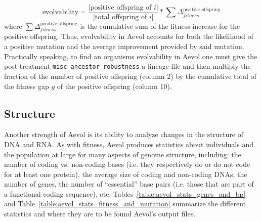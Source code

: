 \begin{equation*}
\text{evolvability} = \frac{|\text{positive offspring of }i|}{|\text{total offspring of }i|}*\sum \Delta^{\text{positive offspring}}_{fitness}
\end{equation*}  where $\sum \Delta^{\text{positive offspring}}_{fitness}$ is the cumulative sum of the fitness increase for the positive offspring. Thus, evolvability in Aevol accounts for both the likelihood of a positive mutation and the average improvement provided by said mutation. Practically speaking, to find an organisms evolvability in Aevol one must give the post-treatment \texttt{misc\_ancestor\_robustness} a lineage file and then multiply the fraction of the number of positive offspring (column 2) by the cumulative total of the fitness gap $g$ of the positive offspring (column 10).


 
\subsection{Structure}\label{methods:structure}
Another strength of Aevol is its ability to analyze changes in the structure of DNA and RNA. As with fitness, Aevol produces statistics about individuals and the population at large for many aspects of genome structure, including: the number of coding vs. non-coding bases (i.e. they respectively do or do not code for at least one protein), the average size of coding and non-coding DNAs, the number of genes, the number of ``essential'' base pairs (i.e. those that are part of a functional coding sequence), etc. Tables~\ref{table:aevol_stats_genes_and_bp} and Table~\ref{table:aevol_stats_fitness_and_mutation} summarize the different statistics and where they are to be found Aevol's output files. 

